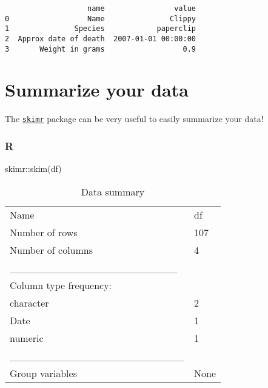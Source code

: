 \documentclass[
  letterpaper,
  DIV=11,
  numbers=noendperiod]{scrreprt}
\newenvironment{Shaded}{\begin{snugshade}}{\end{snugshade}}
\newcommand{\FunctionTok}[1]{\textcolor[rgb]{0.28,0.35,0.67}{#1}}
\newcommand{\NormalTok}[1]{\textcolor[rgb]{0.00,0.46,0.62}{#1}}
\newcommand{\SpecialCharTok}[1]{\textcolor[rgb]{0.37,0.37,0.37}{#1}}
\begin{document}
\begin{verbatim}
                   name                value
0                  Name               Clippy
1               Species            paperclip
2  Approx date of death  2007-01-01 00:00:00
3       Weight in grams                  0.9
\end{verbatim}

\hypertarget{summarize-your-data}{%
\section{Summarize your data}\label{summarize-your-data}}

\begin{tcolorbox}[standard jigsaw,bottomtitle=1mm, opacitybacktitle=0.6, coltitle=black, colback=white, arc=.35mm, leftrule=.75mm, titlerule=0mm, rightrule=.15mm, opacityback=0, colframe=quarto-callout-tip-color-frame, title=\textcolor{quarto-callout-tip-color}{\faLightbulb}\hspace{0.5em}{The skimr package}, toprule=.15mm, colbacktitle=quarto-callout-tip-color!10!white, bottomrule=.15mm, toptitle=1mm, left=2mm]
The \href{https://docs.ropensci.org/skimr/}{\texttt{skimr}} package can
be very useful to easily summarize your data!
\end{tcolorbox}

\hypertarget{r-5}{%
\subsubsection{R}\label{r-5}}

\begin{Shaded}
\begin{Highlighting}[]
\NormalTok{skimr}\SpecialCharTok{::}\FunctionTok{skim}\NormalTok{(df)}
\end{Highlighting}
\end{Shaded}

\begin{longtable}[]{@{}ll@{}}
\caption{Data summary}\tabularnewline
\toprule()
\endhead
Name & df \\
Number of rows & 107 \\
Number of columns & 4 \\
\_\_\_\_\_\_\_\_\_\_\_\_\_\_\_\_\_\_\_\_\_\_\_ & \\
Column type frequency: & \\
character & 2 \\
Date & 1 \\
numeric & 1 \\
\_\_\_\_\_\_\_\_\_\_\_\_\_\_\_\_\_\_\_\_\_\_\_\_ & \\
Group variables & None \\
\bottomrule()
\end{longtable}
\end{document}
